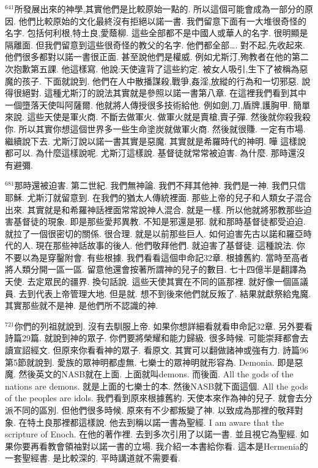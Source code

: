\documentclass{book}
\begin{document}
$^{641}$所發展出來的神學,其實他們是比較原始一點的.
所以這個可能會成為一部分的原因.
他們比較原始的文化最終沒有拒絕以諾一書.
我們留意下面有一大堆很奇怪的名字.
包括何利根,特土良,愛蔭柳.
這些全部都不是中國人或華人的名字.
很明顯是隔離面.
但我們留意到這些很奇怪的教父的名字.
他們都全部….
對不起,先收起來.
他們很多都對以諾一書很正面.
甚至說他們是權威.
例如尤斯汀,殉教者在他的第二次抱歉第五課.
他這樣寫.
他說:天使違背了這些約定.
被女人吸引,生下了被稱為惡魔的孩子.
下面就說到.
他們在人中散播謀殺,戰爭,姦淫,放縱的行為和一切邪惡.
說得很絕對.
這種尤斯汀的說法其實就是參照以諾一書第八章.
在這裡我們看到其中一個墮落天使叫阿薩爾.
他就將人傳授很多技術給他.
例如劍,刀,盾牌,護胸甲.
簡單來說.
這些天使是軍火商.
不斷去做軍火.
做軍火就是賣槍,賣子彈.
然後就你殺我殺你.
所以其實你想這個世界多一些生命塗炭就做軍火商.
然後就很賺.
一定有市場.
繼續說下去.
尤斯汀說以諾一書其實是惡魔.
其實就是希羅時代的神明.
嘩 這樣說都可以.
為什麼這樣說呢.
尤斯汀這樣說.
基督徒就常常被迫害.
為什麼.
那時還沒有避彌.

$^{681}$那時還被迫害.
第二世紀.
我們無神論.
我們不拜其他神.
我們是一神.
我們只信耶穌.
尤斯汀就留意到.
在我們的猶太人傳統裡面.
那些上帝的兒子和人類女子混合出來.
其實就是和希羅神話裡面常常說神人混合.
就是一樣.
所以他就將邪教那些迫害基督徒的現象.
即是那些愛邦異教.
不知是邪還是邪.
就和那時基督徒都受迫迫.
就拉了一個很密切的關係.
很合理.
就是以前那些巨人.
如何迫害先古以諾和羅亞時代的人.
現在那些神話故事的後人.
他們敬拜他們.
就迫害了基督徒.
這種說法.
你不要以為是穿鑿附會.
有些根據.
我們看看這個申命記32章.
根據舊約.
當時至高者將人類分開一區一區.
留意他還會按著所謂神的兒子的數目.
七十四億半是翻譯為天使.
去定眾民的疆界.
換句話說.
這些天使其實在不同的區那裡.
就好像一個區議員.
去到代表上帝管理大地.
但是就.
想不到後來他們就反叛了.
結果就獻祭給鬼魔.
其實那些就不是神.
是他們所不認識的神.

$^{721}$你們的列祖就說到.
沒有去馴服上帝.
如果你想詳細看就看申命記32章.
另外要看詩篇29篇.
就說到神的眾子.
你們要將榮耀和能力歸級.
很多時候.
可能崇拜都會去讀宣詔經文.
但原來你看看神的眾子.
看原文.
其實可以翻做諸神或強有力.
詩篇96第5節就說到.
愛族的眾神明都虛無.
七樂士的眾神明就形容為.
Demonia.
即是惡魔.
然後英文的NASB就在上面.
上面就叫demons.
而後面.
All the gods of the nations are demons.
就是上面的七樂士的本.
然後NASB就下面這個.
All the gods of the peoples are idols.
我們看到原來根據舊約.
天使本來作為神的兒子.
就會去分派不同的區別.
但他們很多時候.
原來有不少都叛變了神.
以致成為那裡的敬拜對象.
在特土良那裡都這樣說.
他去到稱以諾一書為聖經.
I am aware that the scripture of Enoch.
在他的著作裡.
去到多次引用了以諾一書.
並且視它為聖經.
如果你要再看教會領袖對以諾一書的立場.
我介紹一本書給你看.
這本是Hermenia的一套聖經書.
是比較深的.
平時講道就不需要看.
\end{document}
